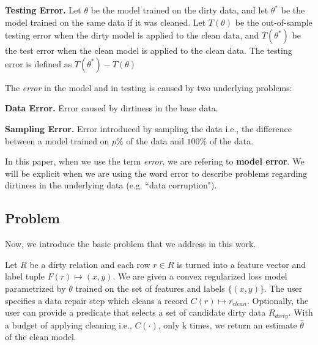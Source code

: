 \vspace{0.5em}

\noindent\textbf{Testing Error. } Let $\theta$ be the model trained on the dirty data, and let $\theta^*$ be the model trained on the same data if it was cleaned. Let $T(\theta)$ be the out-of-sample testing error when the dirty model is applied to the clean data, and $T(\theta^*)$ be the test error when the clean model is applied to the clean data. The testing error is defined as $T(\theta^*) - T(\theta)$

\vspace{0.5em}

\noindent The \emph{error} in the model and in testing is caused by two underlying problems:

\vspace{0.5em}

\noindent\textbf{Data Error. } Error caused by dirtiness in the base data.

\vspace{0.5em}

\noindent\textbf{Sampling Error. } Error introduced by sampling the data i.e., the difference between a model trained on $p\%$ of the data and $100\%$ of the data.

\vspace{0.5em}

In this paper, when we use the term \emph{error}, we are refering to \textbf{model error}.
We will be explicit when we are using the word error to describe problems regarding dirtiness in the underlying data (e.g. ``data corruption").

\subsection{\sys Problem}
Now, we introduce the basic problem that we address in this work.

\begin{problem}\label{activeclean}\sloppy
Let $R$ be a dirty relation and each row $r \in R$ is 
turned into a feature vector and label tuple $F(r) \mapsto (x,y)$.
We are given a convex regularized loss model parametrized
by $\theta$ trained on the set of features and labels $\{(x,y)\}$.
The user specifies a data repair step which cleans a record 
$C(r) \mapsto r_{clean}$.
Optionally, the user can provide a predicate that selects 
a set of candidate dirty data $R_{dirty}$.
With a budget of applying cleaning i.e., $C(\cdot)$, only k times, we return an estimate $\hat{\theta}$ of the clean model.
\end{problem}

